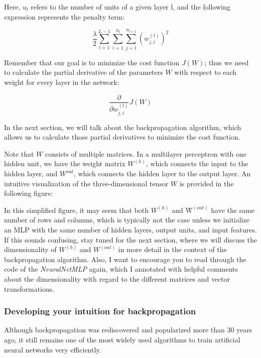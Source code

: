 \documentclass[11pt]{article}
\begin{document}
Here, \(u_l\) refers to the number of units of a given layer l, and the
following expression represents the penalty term:

\[\frac{\lambda}{2}\sum_{l=1}^{L-1}\sum_{i=1}^{u_l}\sum_{j=1}^{u_{l+1}}(w_{j,i}^{(t)})^2\]

Remember that our goal is to minimize the cost function \(J(W)\); thus
we need to calculate the partial derivative of the parameters \(W\) with
respect to each weight for every layer in the network:

\[\frac{\partial}{\partial w_{j,i}^{(l)}} J(W)\]

In the next section, we will talk about the backpropagation algorithm,
which allows us to calculate those partial derivatives to minimize the
cost function.

Note that \(W\) consists of multiple matrices. In a multilayer
perceptron with one hidden unit, we have the weight matrix \(W^{(h)}\),
which connects the input to the hidden layer, and \(W^{out}\), which
connects the hidden layer to the output layer. An intuitive
visualization of the three-dimensional tensor \(W\) is provided in the
following figure:

In this simplified figure, it may seem that both \(W^{(h)}\) and
\(Ẁ^{(out)}\) have the same number of rows and columns, which is
typically not the case unless we initialize an MLP with the same number
of hidden layers, output units, and input features. If this sounds
confusing, stay tuned for the next section, where we will discuss the
dimensionality of \(W^{(h)}\) and \(W^{(out)}\) in more detail in the
context of the backpropagation algorithm. Also, I want to encourage you
to read through the code of the \emph{NeuralNetMLP} again, which I
annotated with helpful comments about the dimensionality with regard to
the different matrices and vector transformations.

    \subsubsection{Developing your intuition for
backpropagation}\label{developing-your-intuition-for-backpropagation}

    Although backpropagation was rediscovered and popularized more than 30
years ago, it still remains one of the most widely used algorithms to
train artificial neural networks very efficiently.
\end{document}
